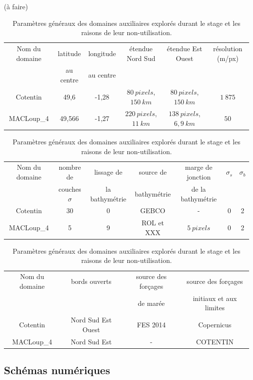 \documentclass[10pt,a4paper,titlepage]{article}
\begin{document}
\begin{table}[h!]
    \centering
    (à faire)
    \begin{tabular}{||c||c|c|c|c|c|}
        \hline
        Nom du domaine & latitude & longitude & étendue Nord Sud & étendue Est Ouest & résolution (m/px)\\
        & au centre & au centre &  &  & \\
        \hline
        Cotentin & 49,6 & -1,28 & $80~pixels$, $150~km$ & $80~pixels$, $150~km$ & $1~875$\\
        MACLoup\_4 & 49,566 & -1,27 & $220~pixels$, $11~km$ & $138~pixels$, $6,9~km$ & $50$\\
        \hline
    \end{tabular}\newline

    \begin{tabular}{||c||c|c|c|c|c|c|}
        \hline
        Nom du domaine & nombre de & lissage de & source de & marge de jonction & $\sigma_{s}$ & $\sigma_{b}$ \\
        & couches $\sigma$ & la bathymétrie & bathymétrie & de la bathymétrie &  & \\
        \hline
        Cotentin & 30 & 0 & GEBCO & - & 0  & 2 \\
        MACLoup\_4 & 5 & 9 & ROL et XXX & $5~pixels$ & 0 & 2 \\
        \hline
    \end{tabular}\newline

    \begin{tabular}{||c||c|c|c|}
        \hline
        Nom du domaine & bords ouverts & source des forçages & source des forçages \\
        &  & de marée & initiaux et aux limites \\
        \hline
        Cotentin & Nord Sud Est Ouest & FES 2014 & Copernicus \\
        MACLoup\_4 & Nord Sud Est & - & COTENTIN \\
        \hline
    \end{tabular}
    \caption{
        Paramètres généraux des domaines auxiliaires explorés durant le stage et les raisons de leur non-utilisation.
    }
    \label{anx:param_generaux_aux}
\end{table}


\subsection{Schémas numériques}
\end{document}
